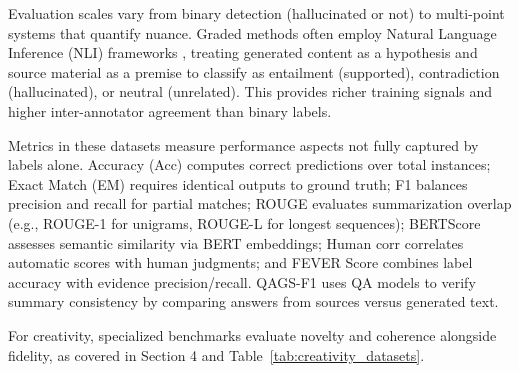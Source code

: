 \documentclass{llncs}
\begin{document}
Evaluation scales vary from binary detection (hallucinated or not) to multi-point systems that quantify nuance. Graded methods often employ Natural Language Inference (NLI) frameworks \cite{bowman2015snli,williams2018mnli}, treating generated content as a hypothesis and source material as a premise to classify as entailment (supported), contradiction (hallucinated), or neutral (unrelated). This provides richer training signals and higher inter-annotator agreement than binary labels.

Metrics in these datasets measure performance aspects not fully captured by labels alone. Accuracy (Acc) computes correct predictions over total instances; Exact Match (EM) requires identical outputs to ground truth; F1 balances precision and recall for partial matches; ROUGE evaluates summarization overlap (e.g., ROUGE-1 for unigrams, ROUGE-L for longest sequences); BERTScore assesses semantic similarity via BERT embeddings; Human corr correlates automatic scores with human judgments; and FEVER Score combines label accuracy with evidence precision/recall. QAGS-F1 uses QA models to verify summary consistency by comparing answers from sources versus generated text.

For creativity, specialized benchmarks evaluate novelty and coherence alongside fidelity, as covered in Section 4 and Table~\ref{tab:creativity_datasets}.
\end{document}
